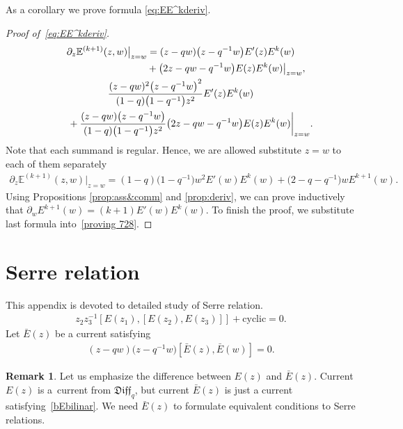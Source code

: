 \documentclass[pdftex]{sigma}
\numberwithin{equation}{section}
\theoremstyle{definition}
\newtheorem{Remark}[Theorem]{Remark}
\newcommand{\qD}{\mathfrak{Diff}_q}
\newcommand{\bE}{\bar{E}}
\begin{document}
As a corollary we prove formula \eqref{eq:EE^kderiv}.
\begin{proof}[Proof of~\eqref{eq:EE^kderiv}]
\begin{gather*}
 \partial_z \mathbb{E}^{(k+1)} (z,w) \big|_{z=w}= (z-qw)\big(z-q^{-1}w\big) E'(z) E^{k}(w) \\
 \hphantom{\partial_z \mathbb{E}^{(k+1)} (z,w) \big|_{z=w}=}{} + \big(2z-qw-q^{-1}w\big) E(z) E^{k}(w) \big|_{z=w},
\\
 \frac{(z-qw)^2 \big(z-q^{-1}w\big)^2}{(1-q)\big(1-q^{-1}\big)z^2} E'(z) E^{k}(w)\\
 \qquad{}{} + \frac{(z-qw)\big(z-q^{-1}w\big)}{(1-q)\big(1-q^{-1}\big)z^2}\big(2z-qw-q^{-1}w\big) E(z) E^{k}(w) \bigg|_{z=w}.
\end{gather*}
Note that each summand is regular. Hence, we are allowed substitute $z=w$ to each of them separately
\begin{gather} \label{proving 728}
 \partial_z \mathbb{E}^{(k+1)} (z,w) \big|_{z=w}= (1-q) \big(1-q^{-1}\big) w^2 E'(w) E^{k}(w) + \big(2-q-q^{-1}\big) w E^{k+1}(w).
\end{gather}
Using Propositions \ref{prop:ass&comm} and \ref{prop:deriv}, we can prove inductively that $\partial_w E^{k+1}(w)= (k+1) E'(w) E^{k}(w)$. To finish the proof, we substitute last formula into~\eqref{proving 728}.
\end{proof}

\section{Serre relation} \label{Appendix:Serre}

This appendix is devoted to detailed study of Serre relation.
\begin{gather*}
z_2 z_3^{-1} [E(z_1), [E(z_2), E(z_3)]] + \mathrm{cyclic} =0.
\end{gather*}
Let $\bE(z)$ be a current satisfying
\begin{gather} \label{bEbilinar}
(z-qw)\big(z-q^{-1}w\big) [ \bE(z),\bE(w)]=0.
\end{gather}
\begin{Remark}
Let us emphasize the difference between $E(z)$ and $\bE(z)$. Current $E(z)$ is a~current from $\qD$, but current $\bE(z)$ is just a current satisfying~\eqref{bEbilinar}. We need $\bE(z)$ to formulate equivalent conditions to Serre relations.
\end{Remark}
\end{document}
